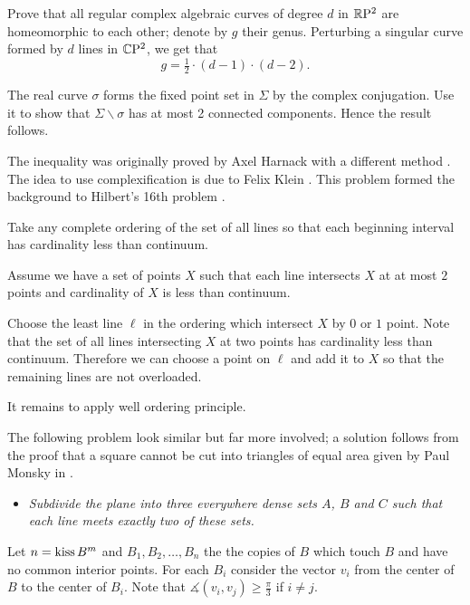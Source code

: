 Prove that all regular complex algebraic curves of degree $d$ in $\mathbb{R}\mathrm{P}^2$
are homeomorphic to each other; 
denote by $g$ their genus.
Perturbing a singular curve formed by  $d$ lines in $\mathbb{C}\mathrm{P}^2$,
we get that 
\[g=\tfrac12\cdot(d-1)\cdot(d-2).\]

The real curve $\sigma$ forms the fixed point set in $\Sigma$ 
by the complex conjugation. 
Use it to show that $\Sigma\backslash\sigma$ has at most 2 connected components.
Hence the result follows.
\qeds
 
The inequality was originally proved 
by Axel Harnack with a different method \cite[see][]{harnack}.
The idea to use complexification is due to Felix Klein \cite[see][]{klein}.
This problem formed the background to Hilbert's 16th problem \cite[see][]{hilbert-problems}. 






Take any complete ordering of the set of all lines 
so that each beginning interval has cardinality less than continuum.

Assume we have a set of points $X$ such that each line intersects $X$ at at most $2$ points and cardinality of $X$ is less than continuum.

Choose the least line $\ell$ in the ordering which intersect $X$ 
by $0$ or $1$ point.
Note that the set of all lines intersecting $X$ at two points has cardinality less than continuum.
Therefore we can choose a point on $\ell$ and add it to $X$ so that the remaining lines are not overloaded.

It remains to apply well ordering principle.
\qeds

The following problem look similar but far more involved;
a solution follows from the proof that a square cannot be cut into triangles of equal area given by Paul Monsky in \cite{monsky}.

\begin{itemize}
\item {\it Subdivide the plane into three everywhere dense sets $A$, $B$ and $C$ such that each line meets exactly two of these sets.}
\end{itemize}









Let $n=\mathop{\rm kiss} B^m$
and $B_1,B_2,\dots, B_n$ the the copies of $B$ 
which touch $B$ and have no common interior points.
For each $B_i$ consider the vector $v_i$ from the center of $B$ to the center of $B_i$.
Note that $\measuredangle(v_i,v_j)\ge \tfrac\pi3$ if $i\ne j$.

